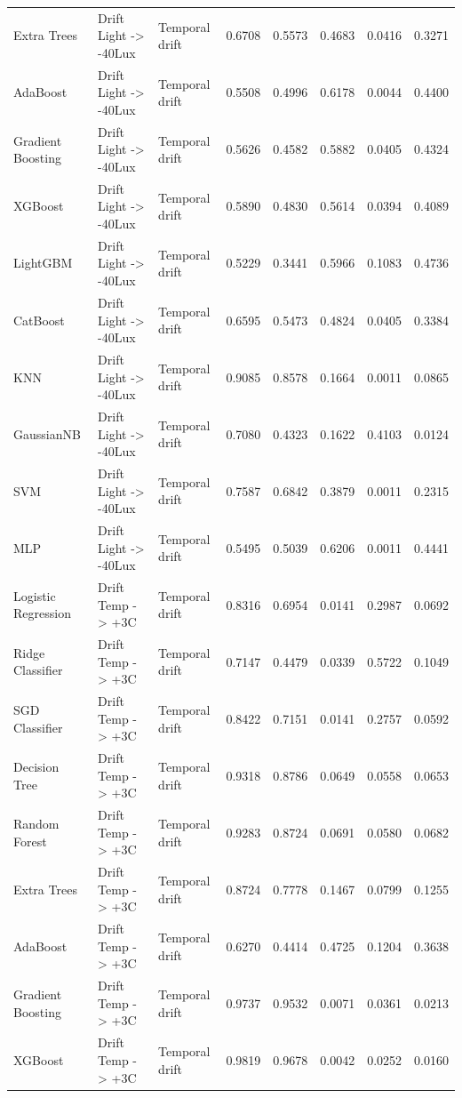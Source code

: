 \begin{tabular}{lllrrrrr}
Extra Trees & Drift Light -> -40Lux & Temporal drift & 0.6708 & 0.5573 & 0.4683 & 0.0416 & 0.3271 \\
AdaBoost & Drift Light -> -40Lux & Temporal drift & 0.5508 & 0.4996 & 0.6178 & 0.0044 & 0.4400 \\
Gradient Boosting & Drift Light -> -40Lux & Temporal drift & 0.5626 & 0.4582 & 0.5882 & 0.0405 & 0.4324 \\
XGBoost & Drift Light -> -40Lux & Temporal drift & 0.5890 & 0.4830 & 0.5614 & 0.0394 & 0.4089 \\
LightGBM & Drift Light -> -40Lux & Temporal drift & 0.5229 & 0.3441 & 0.5966 & 0.1083 & 0.4736 \\
CatBoost & Drift Light -> -40Lux & Temporal drift & 0.6595 & 0.5473 & 0.4824 & 0.0405 & 0.3384 \\
KNN & Drift Light -> -40Lux & Temporal drift & 0.9085 & 0.8578 & 0.1664 & 0.0011 & 0.0865 \\
GaussianNB & Drift Light -> -40Lux & Temporal drift & 0.7080 & 0.4323 & 0.1622 & 0.4103 & 0.0124 \\
SVM & Drift Light -> -40Lux & Temporal drift & 0.7587 & 0.6842 & 0.3879 & 0.0011 & 0.2315 \\
MLP & Drift Light -> -40Lux & Temporal drift & 0.5495 & 0.5039 & 0.6206 & 0.0011 & 0.4441 \\
Logistic Regression & Drift Temp -> +3C & Temporal drift & 0.8316 & 0.6954 & 0.0141 & 0.2987 & 0.0692 \\
Ridge Classifier & Drift Temp -> +3C & Temporal drift & 0.7147 & 0.4479 & 0.0339 & 0.5722 & 0.1049 \\
SGD Classifier & Drift Temp -> +3C & Temporal drift & 0.8422 & 0.7151 & 0.0141 & 0.2757 & 0.0592 \\
Decision Tree & Drift Temp -> +3C & Temporal drift & 0.9318 & 0.8786 & 0.0649 & 0.0558 & 0.0653 \\
Random Forest & Drift Temp -> +3C & Temporal drift & 0.9283 & 0.8724 & 0.0691 & 0.0580 & 0.0682 \\
Extra Trees & Drift Temp -> +3C & Temporal drift & 0.8724 & 0.7778 & 0.1467 & 0.0799 & 0.1255 \\
AdaBoost & Drift Temp -> +3C & Temporal drift & 0.6270 & 0.4414 & 0.4725 & 0.1204 & 0.3638 \\
Gradient Boosting & Drift Temp -> +3C & Temporal drift & 0.9737 & 0.9532 & 0.0071 & 0.0361 & 0.0213 \\
XGBoost & Drift Temp -> +3C & Temporal drift & 0.9819 & 0.9678 & 0.0042 & 0.0252 & 0.0160 \\

\end{tabular}
